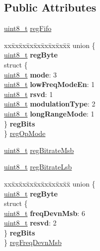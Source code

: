 \subsection*{Public Attributes}
\begin{DoxyCompactItemize}
\item 
\hyperlink{vl53l0x__types_8h_aba7bc1797add20fe3efdf37ced1182c5}{uint8\+\_\+t} \hyperlink{structFSK__Register__Map_af8d816816ccd860848376078e9c8b4b3}{reg\+Fifo}
\item 
\begin{tabbing}
xx\=xx\=xx\=xx\=xx\=xx\=xx\=xx\=xx\=\kill
union \{\\
\>\hyperlink{vl53l0x__types_8h_aba7bc1797add20fe3efdf37ced1182c5}{uint8\_t} {\bfseries regByte}\\
\>struct \{\\
\>\>\hyperlink{vl53l0x__types_8h_aba7bc1797add20fe3efdf37ced1182c5}{uint8\_t} {\bfseries mode}: 3\\
\>\>\hyperlink{vl53l0x__types_8h_aba7bc1797add20fe3efdf37ced1182c5}{uint8\_t} {\bfseries lowFreqModeEn}: 1\\
\>\>\hyperlink{vl53l0x__types_8h_aba7bc1797add20fe3efdf37ced1182c5}{uint8\_t} {\bfseries rsvd}: 1\\
\>\>\hyperlink{vl53l0x__types_8h_aba7bc1797add20fe3efdf37ced1182c5}{uint8\_t} {\bfseries modulationType}: 2\\
\>\>\hyperlink{vl53l0x__types_8h_aba7bc1797add20fe3efdf37ced1182c5}{uint8\_t} {\bfseries longRangeMode}: 1\\
\>\} {\bfseries regBits}\\
\} \hyperlink{structFSK__Register__Map_a80721749f8647cd67732a42b1f420678}{regOpMode}\\

\end{tabbing}\item 
\hyperlink{vl53l0x__types_8h_aba7bc1797add20fe3efdf37ced1182c5}{uint8\+\_\+t} \hyperlink{structFSK__Register__Map_a68832875d214893c0856a059988ecc7b}{reg\+Bitrate\+Msb}
\item 
\hyperlink{vl53l0x__types_8h_aba7bc1797add20fe3efdf37ced1182c5}{uint8\+\_\+t} \hyperlink{structFSK__Register__Map_a64b55aba43322c04e8233b10141abace}{reg\+Bitrate\+Lsb}
\item 
\begin{tabbing}
xx\=xx\=xx\=xx\=xx\=xx\=xx\=xx\=xx\=\kill
union \{\\
\>\hyperlink{vl53l0x__types_8h_aba7bc1797add20fe3efdf37ced1182c5}{uint8\_t} {\bfseries regByte}\\
\>struct \{\\
\>\>\hyperlink{vl53l0x__types_8h_aba7bc1797add20fe3efdf37ced1182c5}{uint8\_t} {\bfseries freqDevnMsb}: 6\\
\>\>\hyperlink{vl53l0x__types_8h_aba7bc1797add20fe3efdf37ced1182c5}{uint8\_t} {\bfseries resvd}: 2\\
\>\} {\bfseries regBits}\\
\} \hyperlink{structFSK__Register__Map_a62d7e754a10094746612f48825d87870}{regFreqDevnMsb}\\


\end{tabbing}
\end{DoxyCompactItemize}
